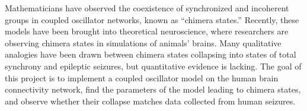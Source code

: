 Mathematicians have observed the coexistence of synchronized and incoherent groups in coupled oscillator networks, known as ``chimera states.''
Recently, these models have been brought into theoretical neuroscience, where researchers are observing chimera states in simulations of animals' brains.
Many qualitative analogies have been drawn between chimera states collapsing into states of total synchrony and epileptic seizures, but quantitative evidence is lacking.
The goal of this project is to implement a coupled oscillator model on the human brain connectivity network, find the parameters of the model leading to chimera states, and observe whether their collapse matches data collected from human seizures.
